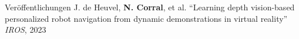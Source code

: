 \begin{rubric}{Veröffentlichungen}
\entry*[] J. de Heuvel, \textbf{N. Corral}, et al. “Learning depth vision-based personalized robot navigation from dynamic demonstrations in virtual reality” \textit{IROS}, 2023 \newline
\end{rubric}
